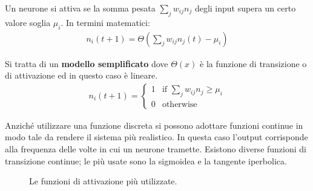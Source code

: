 Un neurone si attiva se la somma pesata $\sum_j w_{ij} n_j$ degli input supera un certo valore soglia $\mu_i$. In termini matematici:
\begin{align}
    n_i(t + 1) = \Theta\left(\sum_j w_{ij} n_j(t) - \mu_i \right)
\end{align}

\newpage

Si tratta di un \textbf{modello semplificato} dove $\Theta(x)$ è la funzione di transizione o di attivazione ed in questo caso è lineare.
\begin{align}
    n_i(t + 1) =
    \begin{cases}
        1 & \mbox{if } \displaystyle\sum_j w_{ij} n_j \geq \mu_i \\
        0 & \mbox{otherwise} 
    \end{cases}
\end{align}

Anziché utilizzare una funzione discreta si possono adottare funzioni continue in modo tale da rendere il sistema più realistico. In questa caso l'output corrisponde alla frequenza delle volte in cui un neurone tramette. Esistono diverse funzioni di transizione continue; le più usate sono la sigmoidea e la tangente iperbolica.\\

\begin{figure}[h!]
	\begin{center}
	\qquad
	\qquad
	\caption{Le funzioni di attivazione più utilizzate.}
	\end{center}
\end{figure}

